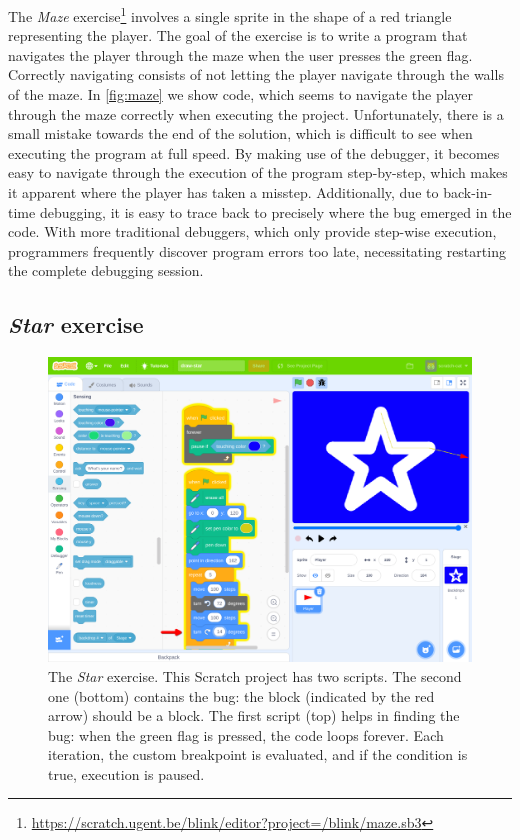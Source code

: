 \documentclass[../main]{subfiles}
\begin{document}
The \emph{Maze} exercise\footnote{\url{https://scratch.ugent.be/blink/editor?project=/blink/maze.sb3}} involves a single sprite in the shape of a red triangle representing the player.
The goal of the exercise is to write a program that navigates the player through the maze when the user presses the green flag.
Correctly navigating consists of not letting the player navigate through the walls of the maze.
In \cref{fig:maze} we show code, which seems to navigate the player through the maze correctly when executing the project.
Unfortunately, there is a small mistake towards the end of the solution, which is difficult to see when executing the program at full speed.
By making use of the debugger, it becomes easy to navigate through the execution of the program step-by-step, which makes it apparent where the player has taken a misstep.
Additionally, due to back-in-time debugging, it is easy to trace back to precisely where the bug emerged in the code.
With more traditional debuggers, which only provide step-wise execution, programmers frequently discover program errors too late, necessitating restarting the complete debugging session.

\subsection{\emph{Star} exercise}\label{subsec:star-exercise}

\begin{figure}
    \begin{wide}
        \includegraphics[width=\linewidth]{draw-star}
    \end{wide}
    \caption[The Star exercise.]{
        The \emph{Star} exercise.
        This Scratch project has two scripts.
        The second one (bottom) contains the bug: the  block (indicated by the red arrow) should be a  block.
        The first script (top) helps in finding the bug: when the green flag is pressed, the code loops forever.
        Each iteration, the custom breakpoint is evaluated, and if the condition is true, execution is paused.
    }
    \label{fig:star-exercise}
\end{figure}
\end{document}
